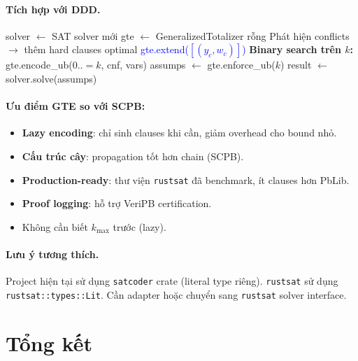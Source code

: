 \documentclass[11pt,a4paper]{article}
\begin{document}
\paragraph{Tích hợp với DDD.}

\begin{algorithm}[H]
\caption{DDD + SAT + GTE (thay thế RC2)}
\begin{algorithmic}[1]
\State solver $\gets$ SAT solver mới
\State gte $\gets$ GeneralizedTotalizer rỗng
\Loop {}
    \State Phát hiện conflicts $\to$ thêm hard clauses
     \Return optimal \EndIf
  \EndIf
    \State \textcolor{blue}{gte.extend($[(y_c, w_c)]$)} 
  \EndFor
  \State \textbf{Binary search trên $k$:}
  \State gte.encode\_ub($0..{=}k$, cnf, vars) 
  \State assumps $\gets$ gte.enforce\_ub($k$)
  \State result $\gets$ solver.solve(assumps)
\EndLoop
\end{algorithmic}
\end{algorithm}

\paragraph{Ưu điểm GTE so với SCPB:}
\begin{itemize}
  \item \textbf{Lazy encoding}: chỉ sinh clauses khi cần, giảm overhead cho bound nhỏ.
  \item \textbf{Cấu trúc cây}: propagation tốt hơn chain (SCPB).
  \item \textbf{Production-ready}: thư viện \texttt{rustsat} đã benchmark, ít clauses hơn PbLib.
  \item \textbf{Proof logging}: hỗ trợ VeriPB certification.
  \item Không cần biết $k_{\max}$ trước (lazy).
\end{itemize}

\paragraph{Lưu ý tương thích.}
Project hiện tại sử dụng \texttt{satcoder} crate (literal type riêng). \texttt{rustsat} sử dụng \texttt{rustsat::types::Lit}. Cần adapter hoặc chuyển sang \texttt{rustsat} solver interface.


\section{Tổng kết}
\end{document}
